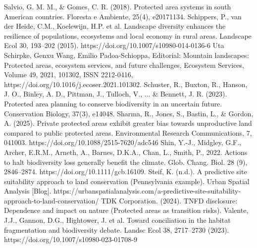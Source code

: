 \documentclass[12pt]{article}
\theoremstyle{break} %
\begin{document}
\newline \newline
Salvio, G. M. M., \& Gomes, C. R. (2018). Protected area systems in south American countries. Floresta e Ambiente, 25(4), e20171134.
\newline \newline
Schippers, P., van der Heide, C.M., Koelewijn, H.P. et al. Landscape diversity enhances the resilience of populations, ecosystems and local economy in rural areas. Landscape Ecol 30, 193–202 (2015). https://doi.org/10.1007/s10980-014-0136-6
\newline \newline
Uta Schirpke, Genxu Wang, Emilio Padoa-Schioppa, Editorial: Mountain landscapes: Protected areas, ecosystem services, and future challenges, Ecosystem Services, Volume 49, 2021, 101302, ISSN 2212-0416, https://doi.org/10.1016/j.ecoser.2021.101302.
\newline \newline
Schuster, R., Buxton, R., Hanson, J. O., Binley, A. D., Pittman, J., Tulloch, V., ... \& Bennett, J. R. (2023). Protected area planning to conserve biodiversity in an uncertain future. Conservation Biology, 37(3), e14048.
\newline \newline
Sharma, R., Jones, S., Bastin, L., \& Gordon, A. (2025). Private protected areas exhibit greater bias towards unproductive land compared to public protected areas. Environmental Research Communications, 7, 041003. https://doi.org/10.1088/2515-7620/adc546
\newline \newline
Shin, Y.-J., Midgley, G.F., Archer, E.R.M., Arneth, A., Barnes, D.K.A., Chan, L., Smith, P., 2022. Actions to halt biodiversity loss generally benefit the climate. Glob. Chang. Biol. 28 (9), 2846–2874. https://doi.org/10.1111/gcb.16109. 
\newline \newline
Steif, K. (n.d.). A predictive site suitability approach to land conservation (Pennsylvania example). Urban Spatial Analysis [Blog]. https://urbanspatialanalysis.com/a-predictive-site-suitability-approach-to-land-conservation/
\newline \newline
TDK Corporation. (2024). TNFD disclosure: Dependence and impact on nature (Protected areas as transition risks).
\newline \newline
Valente, J.J., Gannon, D.G., Hightower, J. et al. Toward conciliation in the habitat fragmentation and biodiversity debate. Landsc Ecol 38, 2717–2730 (2023). https://doi.org/10.1007/s10980-023-01708-9
\end{document}
